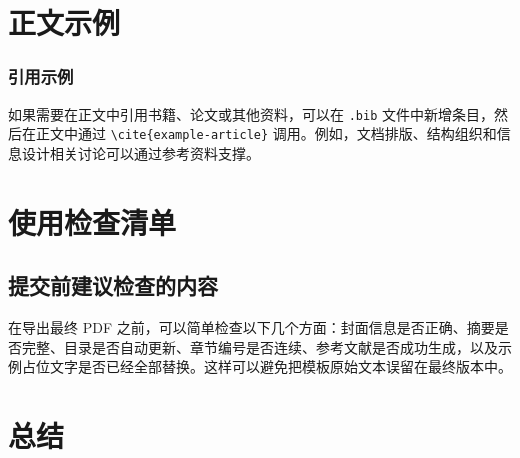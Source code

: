 \documentclass[a4paper]{ctexrep}
\begin{document}
\chapter{正文示例}

\subsection{引用示例}
如果需要在正文中引用书籍、论文或其他资料，可以在 \texttt{.bib} 文件中新增条目，然后在正文中通过 \verb|\cite{example-article}| 调用。例如，文档排版、结构组织和信息设计相关讨论可以通过参考资料支撑\cite{example-article}。

\chapter{使用检查清单}
\section{提交前建议检查的内容}
在导出最终 PDF 之前，可以简单检查以下几个方面：封面信息是否正确、摘要是否完整、目录是否自动更新、章节编号是否连续、参考文献是否成功生成，以及示例占位文字是否已经全部替换。这样可以避免把模板原始文本误留在最终版本中。

\chapter{总结}

\clearpage


\end{document}
